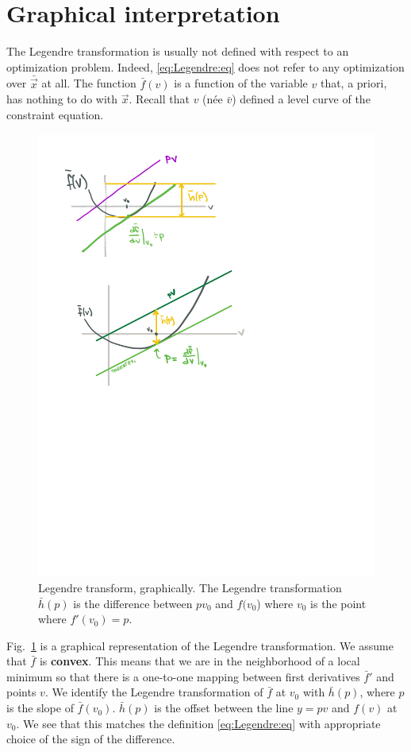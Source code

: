 \section{Graphical interpretation}

The Legendre transformation is usually not defined with respect to an optimization problem. Indeed, \eqref{eq:Legendre:eq} does not refer to any optimization over $\bar{\vec{x}}$ at all. The function $\bar f(v)$ is a function of the variable $v$ that, a priori, has nothing to do with $\vec{x}$. Recall that $v$ (n\'ee $\bar v$) defined a level curve of the constraint equation.


\begin{figure}[tb]
    \centering
    \includegraphics[width=0.5\linewidth]{figures/Legendre.pdf}
    \caption{Legendre transform, graphically. The Legendre transformation $\bar h(p)$ is the difference between $pv_0$ and $f(v_0$) where $v_0$ is the point where $f'(v_0)=p$. }
    \label{fig:Legendre:fig}
\end{figure}


Fig.~\ref{fig:Legendre:fig} is a graphical representation of the Legendre transformation. We assume that $\bar f$ is \textbf{convex}. This means that we are in the neighborhood of a local minimum so that there is a one-to-one mapping between first derivatives $\bar f'$ and points $v$. We identify the Legendre transformation of $\bar f$ at $v_0$ with $\bar h(p)$, where $p$ is the slope of $\bar f(v_0)$. $\bar h(p)$ is the offset between the line $y=pv$ and $f(v)$ at $v_0$. We see that this matches the definition \eqref{eq:Legendre:eq} with appropriate choice of the sign of the difference.

